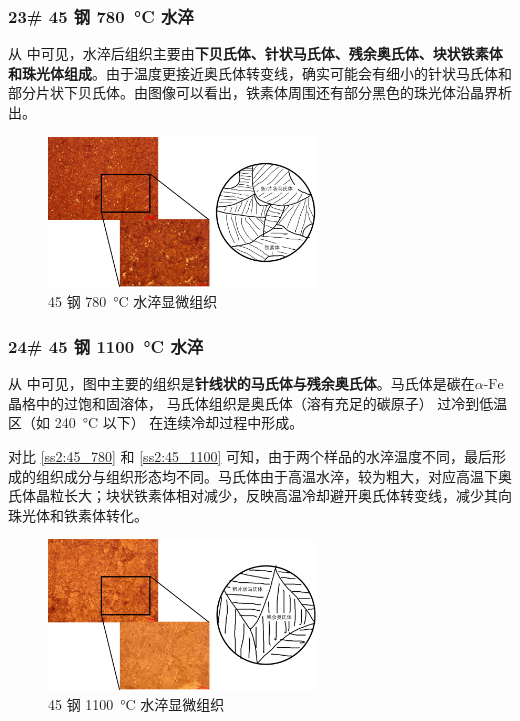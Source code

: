 \documentclass[a4paper,utf8]{article}
\begin{document}
        \subsubsection{23# 45 钢 \SI{780}{\degreeCelsius} 水淬\label{ss2:45_780}}
            从 中可见，水淬后组织主要由\textbf{下贝氏体、针状马氏体、残余奥氏体、块状铁素体和珠光体组成}。由于温度更接近奥氏体转变线，确实可能会有细小的针状马氏体和部分片状下贝氏体。由图像可以看出，铁素体周围还有部分黑色的珠光体沿晶界析出。
            \begin{figure}[!ht]
                \includegraphics[height=40mm]{result/10.pdf}
                \caption{45 钢 \SI{780}{\degreeCelsius} 水淬显微组织\label{fig:10}}
            \end{figure}

        \subsubsection{24# 45 钢 \SI{1100}{\degreeCelsius} 水淬\label{ss2:45_1100}}
            从 中可见，图中主要的组织是\textbf{针线状的马氏体与残余奥氏体}。马氏体是碳在$\alpha\text{-Fe}$ 晶格中的过饱和固溶体， 马氏体组织是奥氏体（溶有充足的碳原子） 过冷到低温区（如 \SI{240}{\degreeCelsius} 以下） 在连续冷却过程中形成。\par
            对比 \ref{ss2:45_780} 和 \ref{ss2:45_1100} 可知，由于两个样品的水淬温度不同，最后形成的组织成分与组织形态均不同。马氏体由于高温水淬，较为粗大，对应高温下奥氏体晶粒长大；块状铁素体相对减少，反映高温冷却避开奥氏体转变线，减少其向珠光体和铁素体转化。

            \begin{figure}[!ht]
                \includegraphics[height=40mm]{result/11.pdf}
                \caption{45 钢 \SI{1100}{\degreeCelsius} 水淬显微组织\label{fig:11}}
            \end{figure}
\end{document}
